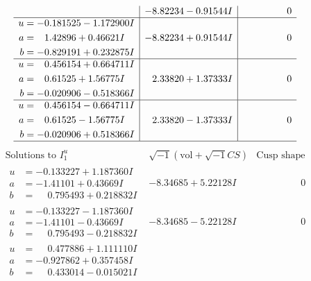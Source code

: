 \documentclass[1p]{elsarticle_modified}
\theoremstyle{definition}
\newcommand{\I}{\sqrt{-1}}
\begin{document}
$$\begin{array}{c|c|c}
 & -8.82234 - 0.91544 I & \phantom{-0.000000 } 0 \\ \hline\begin{aligned}
u &= -0.181525 - 1.172900 I \\
a &= \phantom{-}1.42896 + 0.46621 I \\
b &= -0.829191 + 0.232875 I\end{aligned}
 & -8.82234 + 0.91544 I & \phantom{-0.000000 } 0 \\ \hline\begin{aligned}
u &= \phantom{-}0.456154 + 0.664711 I \\
a &= \phantom{-}0.61525 + 1.56775 I \\
b &= -0.020906 - 0.518366 I\end{aligned}
 & \phantom{-}2.33820 + 1.37333 I & \phantom{-0.000000 } 0 \\ \hline\begin{aligned}
u &= \phantom{-}0.456154 - 0.664711 I \\
a &= \phantom{-}0.61525 - 1.56775 I \\
b &= -0.020906 + 0.518366 I\end{aligned}
 & \phantom{-}2.33820 - 1.37333 I & \phantom{-0.000000 } 0\\
 \hline 
 \end{array}$$\newpage$$\begin{array}{c|c|c}  
\text{Solutions to }I^u_{1}& \I (\text{vol} + \sqrt{-1}CS) & \text{Cusp shape}\\
 \hline 
\begin{aligned}
u &= -0.133227 + 1.187360 I \\
a &= -1.41101 + 0.43669 I \\
b &= \phantom{-}0.795493 + 0.218832 I\end{aligned}
 & -8.34685 + 5.22128 I & \phantom{-0.000000 } 0 \\ \hline\begin{aligned}
u &= -0.133227 - 1.187360 I \\
a &= -1.41101 - 0.43669 I \\
b &= \phantom{-}0.795493 - 0.218832 I\end{aligned}
 & -8.34685 - 5.22128 I & \phantom{-0.000000 } 0 \\ \hline\begin{aligned}
u &= \phantom{-}0.477886 + 1.111110 I \\
a &= -0.927862 + 0.357458 I \\
b &= \phantom{-}0.433014 - 0.015021 I\end{aligned}

\end{array}$$
\end{document}
